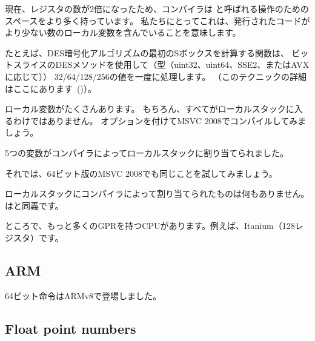 
現在、レジスタの数が2倍になったため、コンパイラは
と呼ばれる操作のためのスペースをより多く持っています。
私たちにとってこれは、発行されたコードがより少ない数のローカル変数を含んでいることを意味します。


たとえば、DES暗号化アルゴリズムの最初のSボックスを計算する関数は、
ビットスライスのDESメソッドを使用して（型（uint32、uint64、SSE2、またはAVXに応じて））
32/64/128/256の値を一度に処理します。
（このテクニックの詳細はここにあります~()）。



ローカル変数がたくさんあります。
もちろん、すべてがローカルスタックに入るわけではありません。 
 オプションを付けてMSVC 2008でコンパイルしてみましょう。



5つの変数がコンパイラによってローカルスタックに割り当てられました。

それでは、64ビット版のMSVC 2008でも同じことを試してみましょう。



ローカルスタックにコンパイラによって割り当てられたものは何もありません。はと同義です。

\iffalse

By the way, we can see here that the function saved the \RCX and \RDX registers in space allocated by the \gls{caller},
but \Reg{8} and \Reg{9} were not saved but used from the beginning.
\fi

ところで、もっと多くの\ac{GPR}を持つCPUがあります。例えば、Itanium（128レジスタ）です。

\subsection{ARM}

64ビット命令はARMv8で登場しました。

\subsection{Float point numbers}

